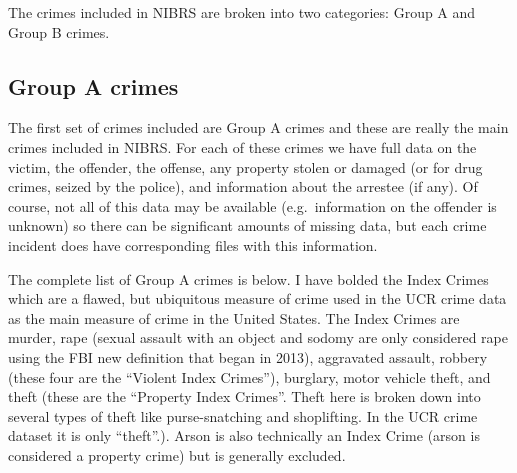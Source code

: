 \documentclass[
]{krantz}
\begin{document}
The crimes included in NIBRS are broken into two categories:
Group A and Group B crimes.

\subsection{Group A crimes}\label{group-a-crimes}

The first set of crimes included are Group A crimes and
these are really the main crimes included in NIBRS. For each
of these crimes we have full data on the victim, the
offender, the offense, any property stolen or damaged (or
for drug crimes, seized by the police), and information
about the arrestee (if any). Of course, not all of this data
may be available (e.g.~information on the offender is
unknown) so there can be significant amounts of missing
data, but each crime incident does have corresponding files
with this information.

The complete list of Group A crimes is below. I have bolded
the Index Crimes which are a flawed, but ubiquitous measure
of crime used in the UCR crime data as the main measure of
crime in the United States. The Index Crimes are murder,
rape (sexual assault with an object and sodomy are only
considered rape using the FBI new definition that began in
2013), aggravated assault, robbery (these four are the
``Violent Index Crimes''), burglary, motor vehicle theft,
and theft (these are the ``Property Index Crimes''. Theft
here is broken down into several types of theft like
purse-snatching and shoplifting. In the UCR crime dataset it
is only ``theft''.). Arson is also technically an Index
Crime (arson is considered a property crime) but is
generally excluded.
\end{document}
